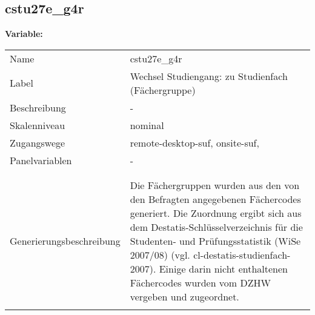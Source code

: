 	
	
	\subsection{cstu27e\_g4r}
	\label{subSection:cstu27e_g4r}

	\noindent\textbf{Variable:}\\
		\begin{tabular}{lL{11.3cm}}
			\label{tableVariable:cstu27e_g4r}
			Name & cstu27e\_g4r \\
			Label & Wechsel Studiengang: zu Studienfach (Fächergruppe) \\
			Beschreibung & - \\
			Skalenniveau & nominal \\
			Zugangswege &
				remote-desktop-suf,
				onsite-suf,
 \\
			Panelvariablen & -
			 \\
			 \\
 \\
					Generierungsbeschreibung & Die Fächergruppen wurden aus den von den Befragten angegebenen Fächercodes generiert. Die Zuordnung ergibt sich aus dem Destatis-Schlüsselverzeichnis für die Studenten- und Prüfungsstatistik (WiSe 2007/08) (vgl. cl-destatis-studienfach-2007).  Einige darin nicht enthaltenen Fächercodes wurden vom DZHW vergeben und zugeordnet. 
				 \\	
			 \\
		\end{tabular}






